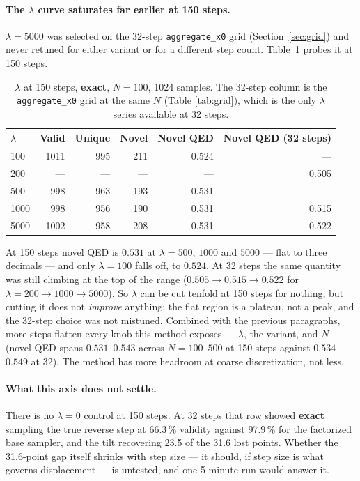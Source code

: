 \documentclass[11pt]{article}
\begin{document}
\paragraph{The $\lambda$ curve saturates far earlier at 150 steps.}
$\lambda = 5000$ was selected on the 32-step \texttt{aggregate\_x0} grid
(Section~\ref{sec:grid}) and never retuned for either variant or for a different
step count. Table~\ref{tab:lambda150} probes it at 150 steps.

\begin{table}[h]
\centering
\caption{$\lambda$ at 150 steps, \textbf{exact}, $N = 100$, 1024 samples. The
32-step column is the \texttt{aggregate\_x0} grid at the same $N$ (Table
\ref{tab:grid}), which is the only $\lambda$ series available at 32 steps.}
\label{tab:lambda150}
\begin{tabular}{lrrrrr}
\toprule
$\lambda$ & Valid & Unique & Novel & Novel QED & Novel QED (32 steps) \\
\midrule
100  & 1011 & 995 & 211 & 0.524 & ---   \\
200  & ---  & --- & --- & ---   & 0.505 \\
500  & 998  & 963 & 193 & 0.531 & ---   \\
1000 & 998  & 956 & 190 & 0.531 & 0.515 \\
5000 & 1002 & 958 & 208 & 0.531 & 0.522 \\
\bottomrule
\end{tabular}
\end{table}

At 150 steps novel QED is $0.531$ at $\lambda = 500$, $1000$ and $5000$ --- flat
to three decimals --- and only $\lambda = 100$ falls off, to $0.524$. At 32 steps
the same quantity was still climbing at the top of the range ($0.505 \to 0.515
\to 0.522$ for $\lambda = 200 \to 1000 \to 5000$). So $\lambda$ can be cut
tenfold at 150 steps for nothing, but cutting it does not \emph{improve} anything:
the flat region is a plateau, not a peak, and the 32-step choice was not
mistuned. Combined with the previous paragraphs, more steps flatten every knob
this method exposes --- $\lambda$, the variant, and $N$ (novel QED spans
$0.531$--$0.543$ across $N = 100$--$500$ at 150 steps against $0.534$--$0.549$ at
32). The method has more headroom at coarse discretization, not less.

\paragraph{What this axis does not settle.}
There is no $\lambda = 0$ control at 150 steps. At 32 steps that row showed
\textbf{exact} sampling the true reverse step at 66.3\,\% validity against
97.9\,\% for the factorized base sampler, and the tilt recovering 23.5 of the
31.6 lost points. Whether the 31.6-point gap itself shrinks with step size --- it
should, if step size is what governs displacement --- is untested, and one
5-minute run would answer it.
\end{document}
